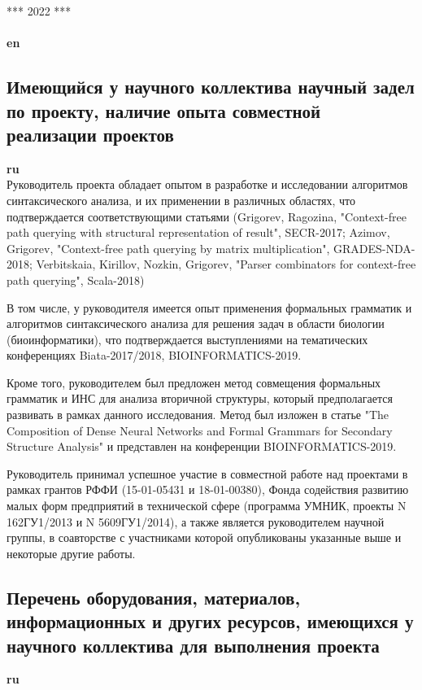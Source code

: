 \documentclass[12pt]{article}  %
\theoremstyle{remark}
\begin{document}
*** 2022 ***
\\
\\
\textbf{en}\\

\subsection{Имеющийся у научного коллектива научный задел по проекту, наличие опыта совместной реализации проектов}

\textbf{ru}\\
%
Руководитель проекта обладает опытом в разработке и исследовании алгоритмов синтаксического анализа, и их применении в различных областях, что подтверждается соответствующими статьями (Grigorev, Ragozina, "Context-free path querying with structural representation of result", SECR-2017; Azimov, Grigorev, "Context-free path querying by matrix multiplication", GRADES-NDA-2018; Verbitskaia, Kirillov, Nozkin, Grigorev, "Parser combinators for context-free path querying", Scala-2018)

В том числе, у руководителя имеется опыт применения формальных грамматик и алгоритмов синтаксического анализа для решения задач в области биологии (биоинформатики), что подтверждается выступлениями на тематических конференциях Biata-2017/2018, BIOINFORMATICS-2019.

Кроме того, руководителем был предложен метод совмещения формальных грамматик и ИНС для анализа вторичной структуры, который предполагается развивать в рамках данного исследования. Метод был изложен в статье "The Composition of Dense Neural Networks and Formal Grammars for Secondary Structure Analysis" и представлен на конференции BIOINFORMATICS-2019.

Руководитель принимал успешное участие в совместной работе над проектами в рамках грантов РФФИ (15-01-05431 и 18-01-00380), Фонда содействия развитию малых форм предприятий в технической сфере
(программа УМНИК, проекты N 162ГУ1/2013 и N 5609ГУ1/2014), а также является руководителем научной группы, в соавторстве с участниками которой опубликованы указанные выше и некоторые другие работы.

\subsection{Перечень оборудования, материалов, информационных и других ресурсов, имеющихся у научного коллектива для выполнения проекта}
\textbf{ru}\\
%
\end{document}
